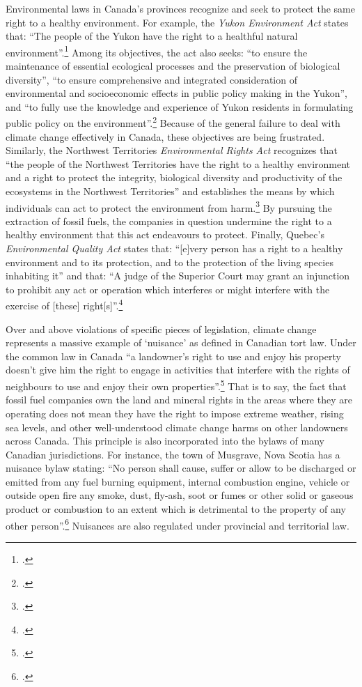 Environmental laws in Canada's provinces recognize and seek to protect the same right to a healthy environment.  
For example, the \emph{Yukon Environment Act} states that: ``The people of the Yukon have the right to a healthful natural environment''.\footcite[][p. 14]{YukonEnvAct}
Among its objectives, the act also seeks: ``to ensure the maintenance of essential ecological processes and the preservation of biological diversity'', ``to ensure comprehensive and integrated consideration of environmental and socioeconomic effects in public policy making in the Yukon'', and ``to fully use the knowledge and experience of Yukon residents in formulating public policy on the environment''.\footcite[][p. 13]{YukonEnvAct}
Because of the general failure to deal with climate change effectively in Canada, these objectives are being frustrated.
Similarly, the Northwest Territories \emph{Environmental Rights Act} recognizes that ``the people of the Northwest Territories have the right to a healthy environment and a right to protect the integrity, biological diversity and productivity of the ecosystems in the Northwest Territories'' and establishes the means by which individuals can act to protect the environment from harm.\footcite[][]{NWTEnvRightsAct}
By pursuing the extraction of fossil fuels, the companies in question undermine the right to a healthy environment that this act endeavours to protect. 
Finally, Quebec's \emph{Environmental Quality Act} states that: ``[e]very person has a right to a healthy environment and to its protection, and to the protection of the living species inhabiting it'' and that: ``A judge of the Superior Court may grant an injunction to prohibit any act or operation which interferes or might interfere with the exercise of [these] right[s]''.\footcite[][]{QuebecEQA}



Over and above violations of specific pieces of legislation, climate change represents a massive example of `nuisance' as defined in Canadian tort law.
Under the common law in Canada ``a landowner's right to use and enjoy his property doesn't give him the right to engage in activities that interfere with the rights of neighbours to use and enjoy their own properties''.\footcite[][]{NuisancesInsider}
That is to say, the fact that fossil fuel companies own the land and mineral rights in the areas where they are operating does not mean they have the right to impose extreme weather, rising sea levels, and other well-understood climate change harms on other landowners across Canada.
This principle is also incorporated into the bylaws of many Canadian jurisdictions.
For instance, the town of Musgrave, Nova Scotia has a nuisance bylaw stating: ``No person shall cause, suffer or allow to be discharged or emitted from any fuel burning equipment, internal combustion engine, vehicle or outside open fire any smoke, dust, fly-ash, soot or fumes or other solid or gaseous product or combustion to an extent which is detrimental to the property of any other person''.\footcite[][]{NuisancesInsider}
Nuisances are also regulated under provincial and territorial law.



